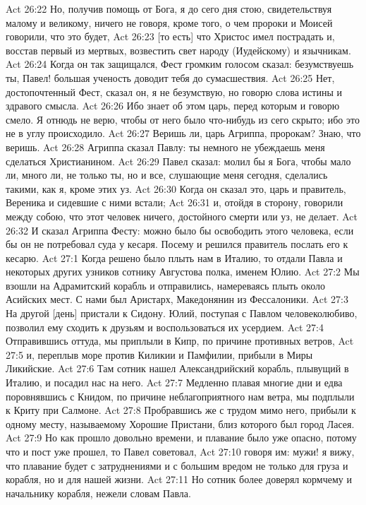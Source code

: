 Act 26:22  Но, получив помощь от Бога, я до сего дня стою, свидетельствуя малому и великому, ничего не говоря, кроме того, о чем пророки и Моисей говорили, что это будет,
Act 26:23  [то есть] что Христос имел пострадать и, восстав первый из мертвых, возвестить свет народу (Иудейскому) и язычникам.
Act 26:24  Когда он так защищался, Фест громким голосом сказал: безумствуешь ты, Павел! большая ученость доводит тебя до сумасшествия.
Act 26:25  Нет, достопочтенный Фест, сказал он, я не безумствую, но говорю слова истины и здравого смысла.
Act 26:26  Ибо знает об этом царь, перед которым и говорю смело. Я отнюдь не верю, чтобы от него было что-нибудь из сего скрыто; ибо это не в углу происходило.
Act 26:27  Веришь ли, царь Агриппа, пророкам? Знаю, что веришь.
Act 26:28  Агриппа сказал Павлу: ты немного не убеждаешь меня сделаться Христианином.
Act 26:29  Павел сказал: молил бы я Бога, чтобы мало ли, много ли, не только ты, но и все, слушающие меня сегодня, сделались такими, как я, кроме этих уз.
Act 26:30  Когда он сказал это, царь и правитель, Вереника и сидевшие с ними встали;
Act 26:31  и, отойдя в сторону, говорили между собою, что этот человек ничего, достойного смерти или уз, не делает.
Act 26:32  И сказал Агриппа Фесту: можно было бы освободить этого человека, если бы он не потребовал суда у кесаря. Посему и решился правитель послать его к кесарю.
Act 27:1  Когда решено было плыть нам в Италию, то отдали Павла и некоторых других узников сотнику Августова полка, именем Юлию.
Act 27:2  Мы взошли на Адрамитский корабль и отправились, намереваясь плыть около Асийских мест. С нами был Аристарх, Македонянин из Фессалоники.
Act 27:3  На другой [день] пристали к Сидону. Юлий, поступая с Павлом человеколюбиво, позволил ему сходить к друзьям и воспользоваться их усердием.
Act 27:4  Отправившись оттуда, мы приплыли в Кипр, по причине противных ветров,
Act 27:5  и, переплыв море против Киликии и Памфилии, прибыли в Миры Ликийские.
Act 27:6  Там сотник нашел Александрийский корабль, плывущий в Италию, и посадил нас на него.
Act 27:7  Медленно плавая многие дни и едва поровнявшись с Книдом, по причине неблагоприятного нам ветра, мы подплыли к Криту при Салмоне.
Act 27:8  Пробравшись же с трудом мимо него, прибыли к одному месту, называемому Хорошие Пристани, близ которого был город Ласея.
Act 27:9  Но как прошло довольно времени, и плавание было уже опасно, потому что и пост уже прошел, то Павел советовал,
Act 27:10  говоря им: мужи! я вижу, что плавание будет с затруднениями и с большим вредом не только для груза и корабля, но и для нашей жизни.
Act 27:11  Но сотник более доверял кормчему и начальнику корабля, нежели словам Павла.
